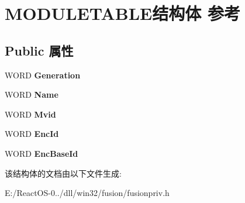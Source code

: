 \hypertarget{struct_m_o_d_u_l_e_t_a_b_l_e}{}\section{M\+O\+D\+U\+L\+E\+T\+A\+B\+L\+E结构体 参考}
\label{struct_m_o_d_u_l_e_t_a_b_l_e}
\subsection*{Public 属性}
\begin{DoxyCompactItemize}
\item 
\mbox{\label{struct_m_o_d_u_l_e_t_a_b_l_e_a4f9f8ce90c51be64d5bb1ca4c9745dcb}} 
W\+O\+RD {\bfseries Generation}
\item 
\mbox{\label{struct_m_o_d_u_l_e_t_a_b_l_e_a1c22791b77398802b3ab621ba7cee125}} 
W\+O\+RD {\bfseries Name}
\item 
\mbox{\label{struct_m_o_d_u_l_e_t_a_b_l_e_ac21d874825edf0b332b082a9bb111958}} 
W\+O\+RD {\bfseries Mvid}
\item 
\mbox{\label{struct_m_o_d_u_l_e_t_a_b_l_e_a2cb20083211d051d90bd1b514d5bc1a3}} 
W\+O\+RD {\bfseries Enc\+Id}
\item 
\mbox{\label{struct_m_o_d_u_l_e_t_a_b_l_e_a51869670634b970786025685d5925e7b}} 
W\+O\+RD {\bfseries Enc\+Base\+Id}
\end{DoxyCompactItemize}


该结构体的文档由以下文件生成\+:\begin{DoxyCompactItemize}
\item 
E\+:/\+React\+O\+S-\/0../dll/win32/fusion/fusionpriv.\+h\end{DoxyCompactItemize}
